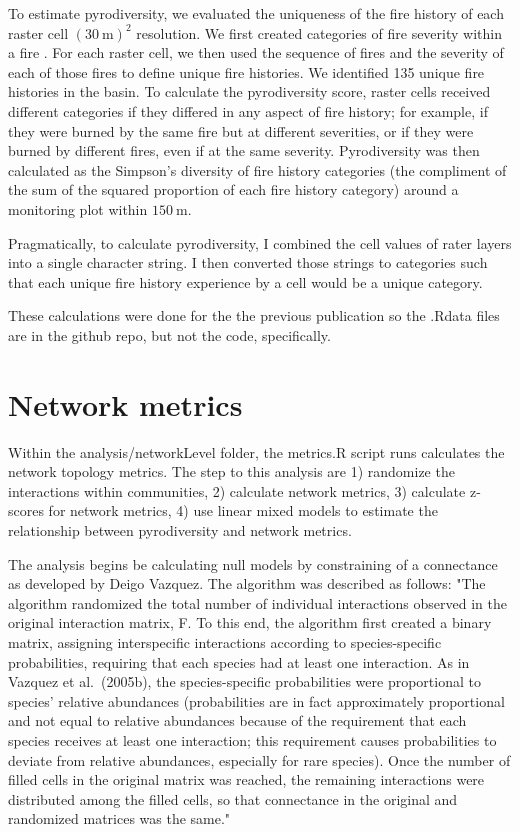 \documentclass{article}\usepackage[]{graphicx}\usepackage[]{color}
\begin{document}
To estimate pyrodiversity, we evaluated the uniqueness of the fire
history of each raster cell $(30~\mathrm{m})^2$ resolution. We first
created categories of fire severity within a fire
\citep{miller2012Yosemite}. For each raster cell, we then used the
sequence of fires and the severity of each of those fires to define
unique fire histories.  We identified 135 unique fire histories in the
basin.  To calculate the pyrodiversity score, raster cells received
different categories if they differed in any aspect of fire history;
for example, if they were burned by the same fire but at different
severities, or if they were burned by different fires, even if at the
same severity.  Pyrodiversity was then calculated as the Simpson's
diversity of fire history categories (the compliment of the sum of the
squared proportion of each fire history category) around a monitoring
plot within $150~\mathrm{m}$.

Pragmatically, to calculate pyrodiversity, I combined the cell
values of rater layers into a single character string. I then
converted those strings to categories such that each unique fire
history experience by a cell would be a unique category.

These calculations were done for the the previous publication so the
.Rdata files are in the github repo, but not the code, specifically.

\section{Network metrics}
\label{sec:metrics}

Within the analysis/networkLevel folder, the metrics.R script runs
calculates the network topology metrics. The step to this analysis are
1) randomize the interactions within communities, 2) calculate network
metrics, 3) calculate z-scores for network metrics, 4) use linear
mixed models to estimate the relationship between pyrodiversity and
network metrics.

The analysis begins be calculating null models by constraining of a
connectance as developed by Deigo Vazquez. The algorithm was described
as follows: "The algorithm randomized the total number of individual
interactions observed in the original interaction matrix, F. To this
end, the algorithm first created a binary matrix, assigning
interspecific interactions according to species-specific
probabilities, requiring that each species had at least one
interaction. As in Vazquez et al.~(2005b), the species-specific
probabilities were proportional to species' relative abundances
(probabilities are in fact approximately proportional and not equal to
relative abundances because of the requirement that each species
receives at least one interaction; this requirement causes
probabilities to deviate from relative abundances, especially for rare
species). Once the number of filled cells in the original matrix was
reached, the remaining interactions were distributed among the filled
cells, so that connectance in the original and randomized matrices was
the same." \citep[][, page 1122-1123]{vazquez2007species}
\end{document}
